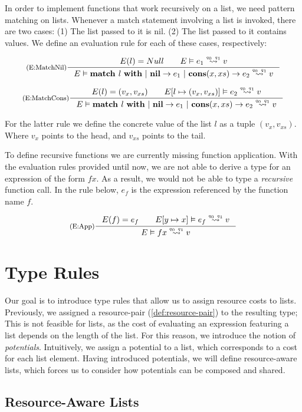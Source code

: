 In order to implement functions that work recursively on a list, we need pattern matching on lists. Whenever a match statement involving a list is invoked, there are two cases: (1) The list passed to it is nil. (2) The list passed to it contains values. We define an evaluation rule for each of these cases, respectively:

\[
   \inference[(E:MatchNil)]
   {E(l) = Null \qquad \evals{E}{e_1}{v}{q_0}{q_1}}
   {\evals{E}{\listmatch{l}{e_1}{e_2}}{v}{q_0}{q_1}}
\]

\[
   \inference[(E:MatchCons)]
   {E(l) = (v_x, v_{xs}) \qquad \evals{\envaugment{E}{l}{(v_x, v_{xs})}}{e_2}{v}{q_0}{q_1}}
   {\evals{E}{\listmatch{l}{e_1}{e_2}}{v}{q_0}{q_1}}
\]

For the latter rule we define the concrete value of the list \(l\) as a tuple \((v_x, v_{xs})\). Where \(v_x\) points to the head, and \(v_{xs}\) points to the tail. 

To define recursive functions we are currently missing function application. With the evaluation rules provided until now, we are not able to derive a type for an expression of the form \(f x\). As a result, we would not be able to type a \emph{recursive} function call. 
In the rule below, \(e_f\) is the expression referenced by the function name \(f\). 

\[
   \inference[(E:App)]
   {E(f) = e_f \qquad \evals{\envaugment{E}{y}{x}}{e_f}{v}{q_0}{q_1}}
   {\evals{E}{f x}{v}{q_0}{q_1}}
\]

\section{Type Rules}

Our goal is to introduce type rules that allow us to assign resource costs to lists. Previously, we assigned a resource-pair (\cref{def:resource-pair}) to the resulting type; This is not feasible for lists, as the cost of evaluating an expression featuring a list depends on the length of the list. For this reason, we introduce the notion of \emph{potentials}. Intuitively, we assign a potential to a list, which corresponds to a cost for each list element. Having introduced potentials, we will define resource-aware lists, which forces us to consider how potentials can be composed and shared.

\subsection{Resource-Aware Lists}

